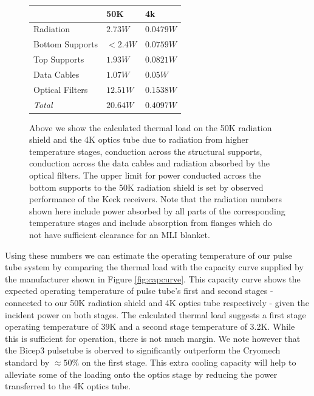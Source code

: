 \documentclass[12pt]{article}
\begin{document}
\begin{figure}
	\center
	\begin{tabular}{|l||l||l|}
		\hline
		& \textbf{50K}  & \textbf{4k}\\
		\hline \hline
		Radiation & $2.73 W$ & $0.0479 W$\\
		Bottom Supports & $<2.4 W$ & $0.0759 W$\\
		Top Supports & $1.93 W$ & $0.0821 W$\\
		Data Cables & $1.07 W$ & $0.05 W$\\
		Optical Filters & $12.51 W$ & $0.1538 W$\\
		\hline
		\textit{Total} & $20.64 W$ & $0.4097 W$\\
		\hline
	\end{tabular}
	\caption{Above we show the calculated thermal load on the 50K radiation
	shield and the 4K optics tube due to radiation from higher temperature
	stages, conduction across the structural supports, conduction across the
	data cables and radiation absorbed by the optical filters. The upper limit
	for power conducted across the bottom supports to the 50K radiation shield
	is set by observed performance of the Keck receivers. Note that the
	radiation numbers shown here include power absorbed by all parts of the
	corresponding temperature stages and include absorption from flanges which
	do not have sufficient clearance for an MLI blanket.}
	\label{table:heatload}
\end{figure}


Using these numbers we can estimate the operating temperature of our pulse
tube system by comparing the thermal load with the capacity curve supplied by
the manufacturer shown in Figure \ref{fig:capcurve}. This capacity curve shows
the expected operating temperature of pulse tube's first and second stages -
connected to our 50K radiation shield and 4K optics tube respectively - given
the incident power on both stages. The calculated thermal
load suggests a first stage operating temperature of 39K and a second stage
temperature of 3.2K. While this is sufficient for operation, there is not much
margin. We note however that the Bicep3 pulsetube is oberved to significantly outperform
the Cryomech standard by $\approx 50\%$ on the first stage. This extra
cooling capacity will help to alleviate some of the loading onto the optics
stage by reducing the power transferred to the 4K optics tube.
\end{document}
